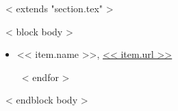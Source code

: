 ~< extends "section.tex" >~

~< block body >~
  \begin{itemize}
    ~< for item in items >~
      \item << item.name >>, \href{https://scholar.google.com/citations?user=<< item.url >>}{<< item.url >>}
        \iffalse
        \begin{itemize}
          ~< for detail in item.details ->~
            \item <<detail>>
          ~<- endfor ->~
        \end{itemize}
        \fi
    ~< endfor >~
  \end{itemize}
~< endblock body >~
